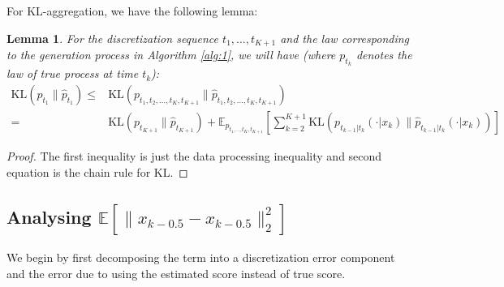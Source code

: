 \documentclass{article}
\newcommand{\E}{\mathbb{E}}
\newcommand{\KL}[2]{\mathrm{KL}\left(#1 \big\| #2\right)}
\newtheorem{lemma}{Lemma}[section]
\begin{document}
\noindent
For KL-aggregation, we have the following lemma:
\begin{lemma}
\label{lemma_second_KL_data_processing_ineq}
  For the discretization sequence $t_1,...,t_{K+1}$ and the law corresponding to the generation process in Algorithm \ref{alg:1}, we will have (where ${p}_{t_k}$ denotes the law of true process at time $t_k$):
  \begin{align*}
    \KL{{p}_{t_1}}{\hat{p}_{t_1}}
    \leq & \KL{{p}_{t_1, t_2, ..., t_{K}, t_{K+1}}}{\hat{p}_{t_1, t_2, ..., t_{K},t_{K+1}}}\\
    =& \KL{{p}_{t_{K+1}}}{\hat{p}_{t_{K+1}}} + 
   \E_{{p}_{t_1,..,t_{K}, t_{K+1}}} \left[ \sum_{k=2}^{K+1}
       \KL{{p}_{t_{k-1}|t_k}(\cdot|{x}_{k})}{\hat{p}_{t_{k-1}|t_k}(\cdot|{x}_k)}\right]
  \end{align*}
\end{lemma}
\begin{proof}
    The first inequality is just the data processing inequality and second equation is the chain rule for KL.
\end{proof}




\subsection{Analysing $\mathbb{E}[\|x_{k-0.5}- \hat{x}_{k-0.5}\|^2_2]$}

\noindent
 We begin by first decomposing the term into a discretization error component and the error due to using the estimated score instead of true score. 
\end{document}
